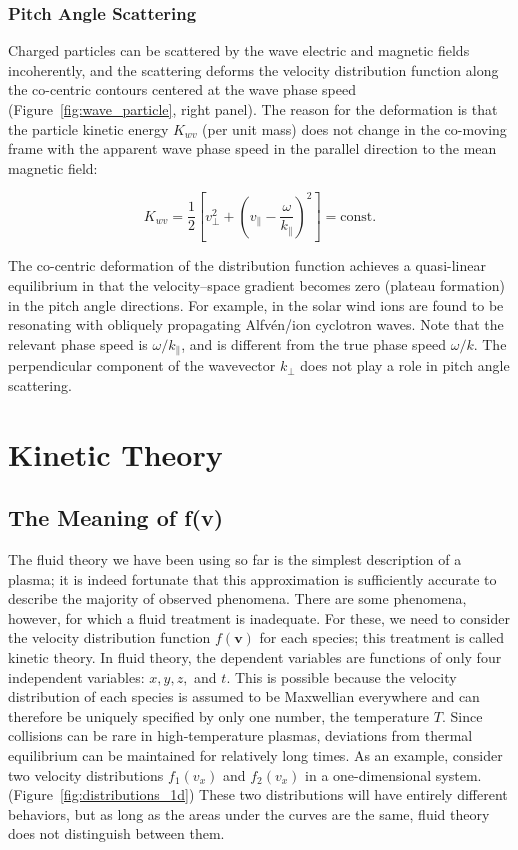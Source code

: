 \documentclass[
  notoc %
]{tufte-book}
\begin{document}
\hypertarget{pitch-angle-scattering}{%
\subsection{Pitch Angle Scattering}\label{pitch-angle-scattering}}

Charged particles can be scattered by the wave electric and magnetic
fields incoherently, and the scattering deforms the velocity
distribution function along the co-centric contours centered at the wave
phase speed (Figure~\ref{fig:wave_particle}, right panel). The reason
for the deformation is that the particle kinetic energy \(K_{wv}\) (per
unit mass) does not change in the co-moving frame with the apparent wave
phase speed in the parallel direction to the mean magnetic field:

\[
K_{wv} = \frac{1}{2}\left[ v_\perp^2 + \left( v_\parallel - \frac{\omega}{k_\parallel} \right)^2 \right] = \text{const}.
\]

The co-centric deformation of the distribution function achieves a
quasi-linear equilibrium in that the velocity--space gradient becomes
zero (plateau formation) in the pitch angle directions. For example, in
the solar wind ions are found to be resonating with obliquely
propagating Alfvén/ion cyclotron waves. Note that the relevant phase
speed is \(\omega/k_\parallel\), and is different from the true phase
speed \(\omega/k\). The perpendicular component of the wavevector
\(k_\perp\) does not play a role in pitch angle scattering.

\hypertarget{sec:kinetic}{%
\chapter{Kinetic Theory}\label{sec:kinetic}}

\hypertarget{the-meaning-of-fv}{%
\section{The Meaning of f(v)}\label{the-meaning-of-fv}}

The fluid theory we have been using so far is the simplest description
of a plasma; it is indeed fortunate that this approximation is
sufficiently accurate to describe the majority of observed phenomena.
There are some phenomena, however, for which a fluid treatment is
inadequate. For these, we need to consider the velocity distribution
function \(f(\mathbf{v})\) for each species; this treatment is called
kinetic theory. In fluid theory, the dependent variables are functions
of only four independent variables: \(x, y, z,\) and \(t\). This is
possible because the velocity distribution of each species is assumed to
be Maxwellian everywhere and can therefore be uniquely specified by only
one number, the temperature \(T\). Since collisions can be rare in
high-temperature plasmas, deviations from thermal equilibrium can be
maintained for relatively long times. As an example, consider two
velocity distributions \(f_1(v_x)\) and \(f_2(v_x)\) in a
one-dimensional system. (Figure~\ref{fig:distributions_1d}) These two
distributions will have entirely different behaviors, but as long as the
areas under the curves are the same, fluid theory does not distinguish
between them.
\end{document}
